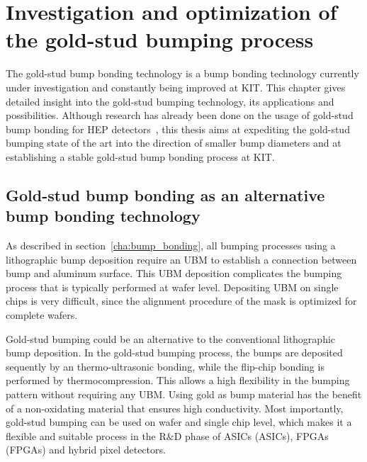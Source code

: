 \acresetall
\chapter{Investigation and optimization of the gold-stud bumping process}\label{cha:gold-stud_bumping}
The gold-stud bump bonding technology is a bump bonding technology currently under investigation and constantly being improved at \ac{KIT}. This chapter gives detailed insight into the gold-stud bumping technology, its applications and possibilities. Although research has already been done on the usage of gold-stud bump bonding for \ac{HEP} detectors~\cite{Tri10}, this thesis aims at expediting the gold-stud bumping state of the art into the direction of smaller bump diameters and at establishing a stable gold-stud bump bonding process at \ac{KIT}.


\section{Gold-stud bump bonding as an alternative bump bonding technology}
As described in section~\ref{cha:bump_bonding}, all bumping processes using a lithographic bump deposition require an \ac{UBM} to establish a connection between bump and aluminum surface. This \ac{UBM} deposition complicates the bumping process that is typically performed at wafer level. Depositing \ac{UBM} on single chips is very difficult, since the alignment procedure of the mask is optimized for complete wafers.

Gold-stud bumping could be an alternative to the conventional lithographic bump deposition. In the gold-stud bumping process, the bumps are deposited sequently by an thermo-ultrasonic bonding, while the flip-chip bonding is performed by thermocompression. This allows a high flexibility in the bumping pattern without requiring any \ac{UBM}. Using gold as bump material has the benefit of a non-oxidating material that ensures high conductivity. Most importantly, gold-stud bumping can be used on wafer and single chip level, which makes it a flexible and suitable process in the R$\&$D phase of \acl{ASIC}s (\acs{ASIC}s), \acl{FPGA}s (\acs{FPGA}s) and hybrid pixel detectors.

